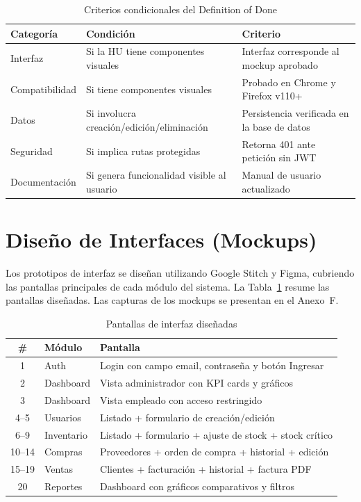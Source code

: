 \documentclass[12pt, letterpaper]{report}
\begin{document}
\begin{table}[H]
\centering
\caption{Criterios condicionales del Definition of Done}
\renewcommand{\arraystretch}{1.3}
\begin{tabularx}{\textwidth}{|l|X|X|}
\hline
\textbf{Categoría} & \textbf{Condición} & \textbf{Criterio} \\ \hline
Interfaz & Si la HU tiene componentes visuales & Interfaz corresponde al mockup aprobado \\ \hline
Compatibilidad & Si tiene componentes visuales & Probado en Chrome y Firefox v110+ \\ \hline
Datos & Si involucra creación/edición/eliminación & Persistencia verificada en la base de datos \\ \hline
Seguridad & Si implica rutas protegidas & Retorna 401 ante petición sin JWT \\ \hline
Documentación & Si genera funcionalidad visible al usuario & Manual de usuario actualizado \\ \hline
\end{tabularx}
\end{table}

\section{Diseño de Interfaces (Mockups)}

Los prototipos de interfaz se diseñan utilizando Google Stitch y Figma, cubriendo las pantallas principales de cada módulo del sistema. La Tabla~\ref{tab:mockups} resume las pantallas diseñadas. Las capturas de los mockups se presentan en el Anexo~F.

\begin{table}[H]
\centering
\caption{Pantallas de interfaz diseñadas}
\label{tab:mockups}
\renewcommand{\arraystretch}{1.2}
\begin{tabularx}{\textwidth}{|c|l|X|}
\hline
\textbf{\#} & \textbf{Módulo} & \textbf{Pantalla} \\ \hline
1 & Auth & Login con campo email, contraseña y botón Ingresar \\ \hline
2 & Dashboard & Vista administrador con KPI cards y gráficos \\ \hline
3 & Dashboard & Vista empleado con acceso restringido \\ \hline
4--5 & Usuarios & Listado + formulario de creación/edición \\ \hline
6--9 & Inventario & Listado + formulario + ajuste de stock + stock crítico \\ \hline
10--14 & Compras & Proveedores + orden de compra + historial + edición \\ \hline
15--19 & Ventas & Clientes + facturación + historial + factura PDF \\ \hline
20 & Reportes & Dashboard con gráficos comparativos y filtros \\ \hline
\end{tabularx}
\end{table}
\end{document}
